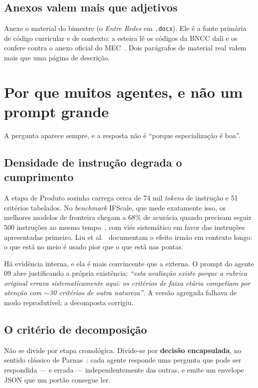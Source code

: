 \documentclass[11pt,a4paper]{article}
\newcommand{\cod}[1]{\texttt{\small #1}}
\begin{document}
\subsection{Anexos valem mais que adjetivos}

Anexe o material do bimestre (o \emph{Entre Redes} em \cod{.docx}). Ele é a fonte primária de
código curricular e de contexto: a esteira lê os códigos da BNCC dali e os confere contra o
anexo oficial do MEC~\cite{cne2022}. Dois parágrafos de material real valem mais que uma
página de descrição.

\section{Por que muitos agentes, e não um prompt grande}

A pergunta aparece sempre, e a resposta não é ``porque especialização é boa''.

\subsection{Densidade de instrução degrada o cumprimento}

A etapa de Produto sozinha carrega cerca de 74 mil \emph{tokens} de instrução e 51 critérios
tabelados. No \emph{benchmark} IFScale, que mede exatamente isso, os melhores modelos de
fronteira chegam a 68\% de acurácia quando precisam seguir 500 instruções ao mesmo
tempo~\cite{ifscale2025}, com viés sistemático em favor das instruções apresentadas primeiro.
Liu et al.~\cite{liu2024} documentam o efeito irmão em contexto longo: o que está no meio é
usado pior que o que está nas pontas.

Há evidência interna, e ela é mais convincente que a externa. O prompt do agente 09 abre
justificando a própria existência: \textit{``esta avaliação existe porque a rubrica original
errava sistematicamente aqui: os critérios de faixa etária competiam por atenção com $\sim$30
critérios de outra natureza''}. A versão agregada falhava de modo reprodutível; a decomposta
corrigiu.

\subsection{O critério de decomposição}

Não se divide por etapa cronológica. Divide-se por \textbf{decisão encapsulada}, no sentido
clássico de Parnas~\cite{parnas1972}: cada agente responde uma pergunta que pode ser
respondida --- e errada --- independentemente das outras, e emite um envelope JSON que um
portão consegue ler.
\end{document}
